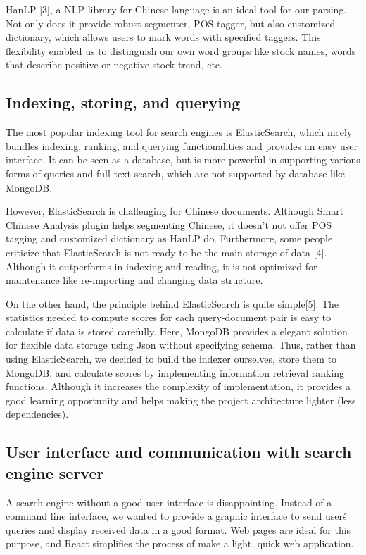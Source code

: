\documentclass{article}
\begin{document}
HanLP [3], a NLP library for Chinese language is an ideal tool for our parsing. Not only does it provide robust segmenter, POS tagger, but also customized dictionary, which allows users to mark words with specified taggers. This flexibility enabled us to distinguish our own word groups like stock names, words that describe positive or negative stock trend, etc.

\subsection{Indexing, storing, and querying}
The most popular indexing tool for search engines is ElasticSearch, which nicely bundles indexing, ranking, and querying functionalities and provides an easy user interface. It can be seen as a database, but is more powerful in supporting various forms of queries and full text search, which are not supported by database like MongoDB. 

However, ElasticSearch is challenging for Chinese documents. Although Smart Chinese Analysis plugin helps segmenting Chinese, it doesn't not offer POS tagging and customized dictionary as HanLP do. Furthermore, some people criticize that ElasticSearch is not ready to be the main storage of data [4]. Although it outperforms in indexing and reading, it is not optimized for maintenance like re-importing and changing data structure.

On the other hand, the principle behind ElasticSearch is quite simple[5]. The statistics needed to compute scores for each query-document pair is easy to calculate if data is stored carefully. Here, MongoDB provides a elegant solution for flexible data storage using Json without specifying schema. Thus, rather than using ElasticSearch, we decided to build the indexer ourselves, store them to MongoDB, and calculate scores by implementing information retrieval ranking functions. Although it increases the complexity of implementation, it provides a good learning opportunity and helps making the project architecture lighter (less dependencies).

\subsection{User interface and communication with search engine server}
A search engine without a good user interface is disappointing. Instead of a command line interface, we wanted to provide a graphic interface to send user\'s queries and display received data in a good format. Web pages are ideal for this purpose, and React simplifies the process of make a light, quick web application. 
\end{document}
